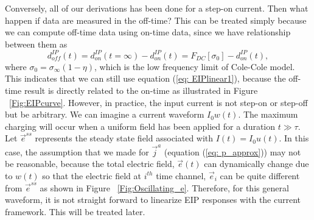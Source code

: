\documentclass[a4paper, 11pt]{article}
\newcommand{\siginf}{\sigma_\infty}
\newcommand{\dsig}{\triangle\sigma}
\renewcommand {\j}  { {\vec j} }
\newcommand {\e}  { {\vec e} }
\newcommand{\dip}{d^{IP}}
\begin{document}
Conversely, all of our derivations has been done for a step-on current. Then what happen if data are measured in the off-time? This can be treated simply because we can compute off-time data using on-time data, since we have relationship between them as
\begin{equation}
  \dip_{off}(t) = \dip_{on}(t=\infty) - \dip_{on}(t) = F_{DC}[\sigma_0] - \dip_{on}(t),
\end{equation}
where $\sigma_0 = \siginf(1-\eta)$, which is the low frequency limit of Cole-Cole model. This indicates that we can still use equation (\ref{eq: EIPlinear1}), because the off-time result is directly related to the on-time as illustrated in Figure ~\ref{Fig:EIPcurve}. However, in practice, the input current is not step-on or step-off but be arbitrary. We can imagine a current waveform $I_0w(t)$. The maximum charging will occur when a uniform field has been applied for a duration $t \gg \tau$. Let $\e^{ss}$ represents the steady state field associated with $I(t) = I_0u(t)$. In this case, the assumption that we made for $\j^a$ (equation (\ref{eq: p_approx})) may not be reasonable, because the total electric field, $\e(t)$ can dynamically change due to $w(t)$ so that the electric field at $i^{th}$ time channel, $\e_i$ can be quite different from $\e^{ss}$ as shown in Figure ~\ref{Fig:Oscillating_e}. Therefore, for this general waveform, it is not straight forward to linearize EIP responses with the current framework. This will be treated later.

\end{document}

